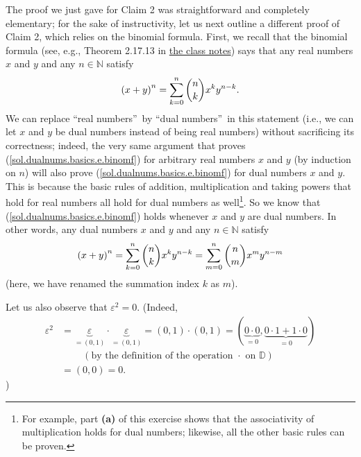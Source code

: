 \documentclass[paper=a4, fontsize=12pt]{scrartcl}%
\let\sumnonlimits\sum
\renewcommand{\sum}{\sumnonlimits\limits}
\theoremstyle{plainsl}
\theoremstyle{definition}
\theoremstyle{remark}
\begin{document}
The proof we just gave for Claim 2 was straightforward and completely
elementary; for the sake of instructivity, let us next outline a different
proof of Claim 2, which relies on the binomial formula. First, we recall that
the binomial formula (see, e.g., Theorem 2.17.13 in
\href{http://www-users.math.umn.edu/~dgrinber/19s/notes.pdf}{the class notes})
says that any real numbers $x$ and $y$ and any $n\in\mathbb{N}$ satisfy%
\begin{equation}
\left(  x+y\right)  ^{n}=\sum_{k=0}^{n}\dbinom{n}{k}x^{k}y^{n-k}.
\label{sol.dualnums.basics.e.binomf}%
\end{equation}
We can replace \textquotedblleft real numbers\textquotedblright\ by
\textquotedblleft dual numbers\textquotedblright\ in this statement (i.e., we
can let $x$ and $y$ be dual numbers instead of being real numbers) without
sacrificing its correctness; indeed, the very same argument that proves
(\ref{sol.dualnums.basics.e.binomf}) for arbitrary real numbers $x$ and $y$
(by induction on $n$) will also prove (\ref{sol.dualnums.basics.e.binomf}) for
dual numbers $x$ and $y$. This is because the basic rules of addition,
multiplication and taking powers that hold for real numbers all hold for dual
numbers as well\footnote{For example, part \textbf{(a)} of this exercise shows
that the associativity of multiplication holds for dual numbers; likewise, all
the other basic rules can be proven.}. So we know that
(\ref{sol.dualnums.basics.e.binomf}) holds whenever $x$ and $y$ are dual
numbers. In other words, any dual numbers $x$ and $y$ and any $n\in\mathbb{N}$
satisfy%
\begin{equation}
\left(  x+y\right)  ^{n}=\sum_{k=0}^{n}\dbinom{n}{k}x^{k}y^{n-k}=\sum
_{m=0}^{n}\dbinom{n}{m}x^{m}y^{n-m} \label{sol.dualnums.basics.e.binomf2}%
\end{equation}
(here, we have renamed the summation index $k$ as $m$).

Let us also observe that $\varepsilon^{2}=0$. (Indeed,
\begin{align*}
\varepsilon^{2}  &  =\underbrace{\varepsilon}_{=\left(  0,1\right)  }%
\cdot\underbrace{\varepsilon}_{=\left(  0,1\right)  }=\left(  0,1\right)
\cdot\left(  0,1\right)  =\left(  \underbrace{0\cdot0}_{=0},\underbrace{0\cdot
1+1\cdot0}_{=0}\right) \\
&  \ \ \ \ \ \ \ \ \ \ \left(  \text{by the definition of the operation }%
\cdot\text{ on }\mathbb{D}\right) \\
&  =\left(  0,0\right)  =0.
\end{align*}
)
\end{document}
